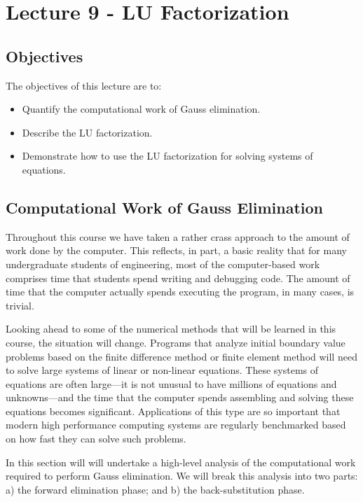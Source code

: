 \chapter{Lecture 9 - LU Factorization}
\label{ch:lec9n}
\section{Objectives}
The objectives of this lecture are to:
\begin{itemize}
\item Quantify the computational work of Gauss elimination.
\item Describe the LU factorization.
\item Demonstrate how to use the LU factorization for solving systems of equations.
\end{itemize}
\setcounter{lstannotation}{0}

\section{Computational Work of Gauss Elimination}

Throughout this course we have taken a rather crass approach to the amount of work done by the computer.  This reflects, in part, a basic reality that for many undergraduate students of engineering, most of the computer-based work comprises time that students spend writing and debugging code.  The amount of time that the computer actually spends executing the program, in many cases, is trivial.  

Looking ahead to some of the numerical methods that will be learned in this course, the situation will change.  Programs that analyze initial boundary value problems based on the finite difference method or finite element method will need to solve large systems of linear or non-linear equations.  These systems of equations are often large---it is not unusual to have millions of equations and unknowns---and the time that the computer spends assembling and solving these equations becomes significant.  Applications of this type are so important that modern high performance computing systems are regularly benchmarked based on how fast they can solve such problems.\cite{HPL,top500}     

In this section will will undertake a high-level analysis of the computational work required to perform Gauss elimination.  We will break this analysis into two parts: a) the forward elimination phase; and b) the back-substitution phase.

